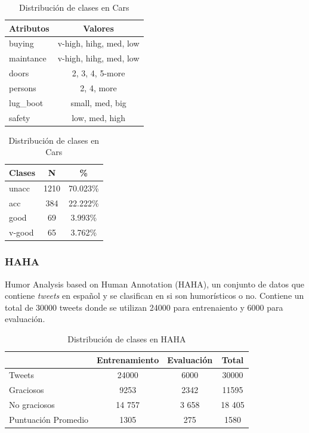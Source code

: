 \begin{table}[ht]
    \centering
    \parbox{.45\linewidth}{
    \begin{tabular} { |l|c| }
        \hline
        Atributos & Valores \\
        \hline
        \hline
        buying & v-high, hihg, med, low \\
        \hline
        maintance &  v-high, hihg, med, low\\
        \hline
        doors & 2, 3, 4, 5-more\\
        \hline
        persons & 2, 4, more\\
        \hline
        lug\_boot & small, med, big\\
        \hline
        safety & low, med, high\\
        \hline
    \end{tabular}
    \caption{Tipos de Atributos en Cars}
    \label{implementation:table:cars:attributes}
    }
    \qquad
    \parbox[t]{.45\linewidth}{
    \begin{tabular} {|l|c|c|}
        \hline
        Clases & N & \% \\
        \hline
        \hline
        unacc & 1210 & 70.023\%\\
        \hline
        acc & 384 & 22.222\%\\
        \hline
        good & 69 & 3.993\%\\
        \hline
        v-good & 65 & 3.762\%\\
        \hline
    \end{tabular}
    \caption{Distribuci\'on de clases en Cars}
    \label{implementation:table:cars:classes}
    }
\end{table}

\subsubsection{HAHA}
Humor Analysis based on Human Annotation (HAHA), un conjunto de datos que contiene \textit{tweets} en espa\~nol y se clasifican en si son humor\'isticos o no. Contiene un total de 30000 tweets donde se utilizan 24000 para entrenaiento y 6000 para evaluaci\'on.

\begin{table}[ht]
    \centering
    \begin{tabular} {|l||c|c|c|}
        \hline
        & Entrenamiento & Evaluaci\'on & Total \\
        \hline
        \hline
        Tweets & 24000 & 6000 & $30000$\\
        \hline
        Graciosos & 9253 & 2342 & 11595\\
        \hline
        No graciosos & 14 757 & 3 658 & 18 405\\
        \hline
        Puntuaci\'on Promedio & 1305 & 275 & 1580\\
        \hline
    \end{tabular}
    \caption{Distribuci\'on de clases en HAHA}
    \label{implementation:table:haha}
\end{table}

